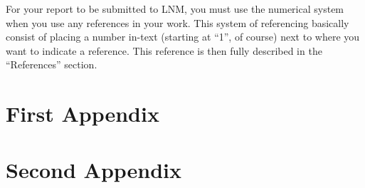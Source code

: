 \documentclass[12pt,a4paper]{article}
\makeatletter
\renewcommand{\cleardoublepage}{\clearpage\if@twoside \ifodd\c@page\else
  \hbox{}
  \vspace*{\fill}
  \thispagestyle{empty}
  \newpage
  \if@twocolumn\hbox{}\newpage\fi\fi\fi}
\makeatother
\begin{document}
For your report to be submitted to LNM, you must use the numerical system when
you use any references in your work. This system of referencing basically
consist of placing a number in-text (starting at ``1'', of course) next to
where you want to indicate a reference.  This reference is then fully
described in the ``References'' section. 

\cleardoublepage
\appendix{}
\section{First Appendix}
\section{Second Appendix}



\cleardoublepage




\end{document}
